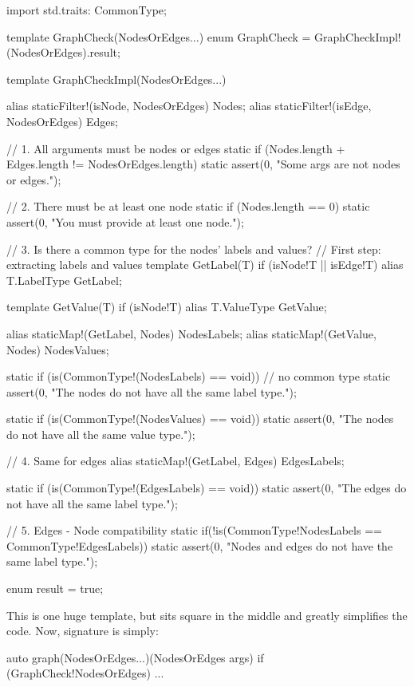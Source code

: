 \begin{dcode}
import std.traits: CommonType;

template GraphCheck(NodesOrEdges...)
{
    enum GraphCheck = GraphCheckImpl!(NodesOrEdges).result;
}

template GraphCheckImpl(NodesOrEdges...)
{
    alias staticFilter!(isNode, NodesOrEdges) Nodes;
    alias staticFilter!(isEdge, NodesOrEdges) Edges;
    
    // 1. All arguments must be nodes or edges
    static if (Nodes.length + Edges.length != NodesOrEdges.length)
    static assert(0, "Some args are not nodes or edges.");
    
    // 2. There must be at least one node
    static if (Nodes.length == 0)
    static assert(0, "You must provide at least one node.");
    
    // 3. Is there a common type for the nodes' labels and values?
    // First step: extracting labels and values
    template GetLabel(T) if (isNode!T || isEdge!T)
    {
        alias T.LabelType GetLabel;
    }
    
    template GetValue(T) if (isNode!T)
    {
        alias T.ValueType GetValue;
    }

    alias staticMap!(GetLabel, Nodes) NodesLabels;
    alias staticMap!(GetValue, Nodes) NodesValues; 
    
    static if (is(CommonType!(NodesLabels) == void)) // no common type
    static assert(0, "The nodes do not have all the same label type.");
    
    static if (is(CommonType!(NodesValues) == void))
    static assert(0, "The nodes do not have all the same value type.");

    // 4. Same for edges
    alias staticMap!(GetLabel, Edges) EdgesLabels;  
    
    static if (is(CommonType!(EdgesLabels) == void))
    static assert(0, "The edges do not have all the same label type.");
        
    // 5. Edges - Node compatibility
    static if(!is(CommonType!NodesLabels == CommonType!EdgesLabels))
        static assert(0, "Nodes and edges do not have the same label type.");
    
    enum result = true;
}    
\end{dcode}

This is one huge template, but  sits square in the middle and greatly simplifies the code. Now,  signature is simply:

\begin{dcode}
auto graph(NodesOrEdges...)(NodesOrEdges args) if (GraphCheck!NodesOrEdges)
{ ... }
\end{dcode}

